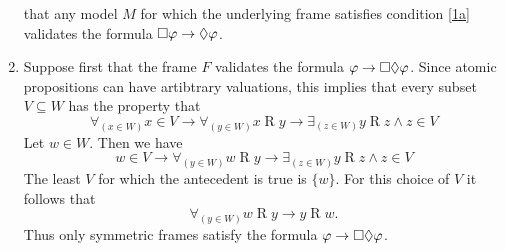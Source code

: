 \documentclass{article}
\begin{document}
\begin{ex}
\begin{enumerate}
that any model $M$ for which the underlying frame satisfies condition \ref{1a}
validates the formula $\square\varphi\to\lozenge\varphi$.
\item Suppose first that the frame $F$ validates the formula $\varphi\to\square\lozenge\varphi$.
Since atomic propositions can have artibtrary valuations, this implies that every
subset $V\subseteq W$ has the property that
\begin{equation*}
\forall_{(x\in W)}x\in V\to\forall_{(y\in W)} x\mathbin{R}y\to\exists_{(z\in W)} y\mathbin{R} z\land z\in V
\end{equation*}
Let $w\in W$. Then we have
\begin{equation*}
w\in V\to\forall_{(y\in W)} w\mathbin{R}y\to\exists_{(z\in W)} y\mathbin{R} z\land z\in V
\end{equation*}
The least $V$ for which the antecedent is true is $\{w\}$. For this choice of $V$
it follows that
\begin{equation*}
\forall_{(y\in W)}w\mathbin{R} y\to y\mathbin{R}w.
\end{equation*}
Thus only symmetric frames satisfy the formula $\varphi\to\square\lozenge\varphi$.


\end{enumerate}
\end{ex}
\end{document}
